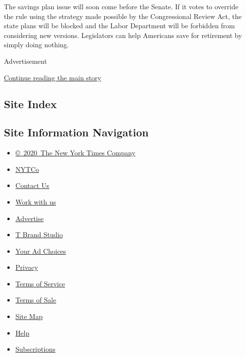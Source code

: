 The savings plan issue will soon come before the Senate. If it votes to
override the rule using the strategy made possible by the Congressional
Review Act, the state plans will be blocked and the Labor Department
will be forbidden from considering new versions. Legislators can help
Americans save for retirement by simply doing nothing.

Advertisement

\protect\hyperlink{after-bottom}{Continue reading the main story}

\hypertarget{site-index}{%
\subsection{Site Index}\label{site-index}}

\hypertarget{site-information-navigation}{%
\subsection{Site Information
Navigation}\label{site-information-navigation}}

\begin{itemize}
\tightlist
\item
  \href{https://help.nytimes3xbfgragh.onion/hc/en-us/articles/115014792127-Copyright-notice}{©~2020~The
  New York Times Company}
\end{itemize}

\begin{itemize}
\tightlist
\item
  \href{https://www.nytco.com/}{NYTCo}
\item
  \href{https://help.nytimes3xbfgragh.onion/hc/en-us/articles/115015385887-Contact-Us}{Contact
  Us}
\item
  \href{https://www.nytco.com/careers/}{Work with us}
\item
  \href{https://nytmediakit.com/}{Advertise}
\item
  \href{http://www.tbrandstudio.com/}{T Brand Studio}
\item
  \href{https://www.nytimes3xbfgragh.onion/privacy/cookie-policy\#how-do-i-manage-trackers}{Your
  Ad Choices}
\item
  \href{https://www.nytimes3xbfgragh.onion/privacy}{Privacy}
\item
  \href{https://help.nytimes3xbfgragh.onion/hc/en-us/articles/115014893428-Terms-of-service}{Terms
  of Service}
\item
  \href{https://help.nytimes3xbfgragh.onion/hc/en-us/articles/115014893968-Terms-of-sale}{Terms
  of Sale}
\item
  \href{https://spiderbites.nytimes3xbfgragh.onion}{Site Map}
\item
  \href{https://help.nytimes3xbfgragh.onion/hc/en-us}{Help}
\item
  \href{https://www.nytimes3xbfgragh.onion/subscription?campaignId=37WXW}{Subscriptions}
\end{itemize}
